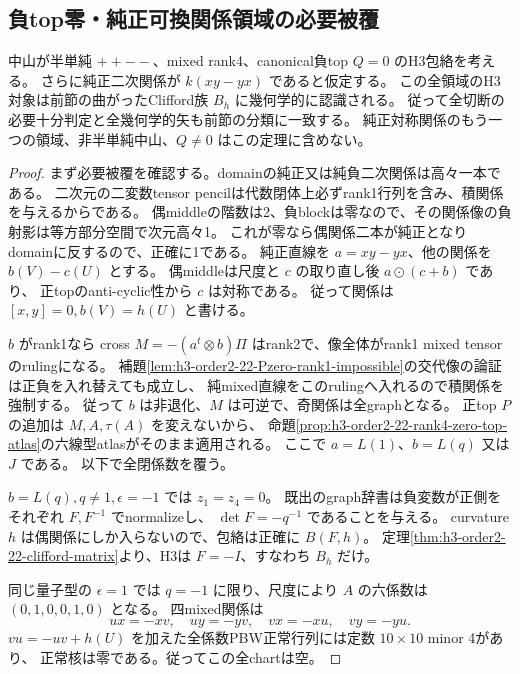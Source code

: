 \subsection{負top零・純正可換関係領域の必要被覆}
\label{subsec:h3-order2-22-Qzero-commutative}
\begin{theorem}\label{thm:h3-order2-22-Qzero-commutative}
中山が半単純 $++--$、mixed rank4、canonical負top $Q=0$ のH3包絡を考える。
さらに純正二次関係が $k(xy-yx)$ であると仮定する。
この全領域のH3対象は前節の曲がったClifford族 $B_h$ に幾何学的に認識される。
従って全切断の必要十分判定と全幾何学的矢も前節の分類に一致する。
純正対称関係のもう一つの領域、非半単純中山、$Q\ne0$ はこの定理に含めない。
\end{theorem}
\begin{proof}
まず必要被覆を確認する。domainの純正又は純負二次関係は高々一本である。
二次元の二変数tensor pencilは代数閉体上必ずrank1行列を含み、積関係を与えるからである。
偶middleの階数は2、負blockは零なので、その関係像の負射影は等方部分空間で次元高々1。
これが零なら偶関係二本が純正となりdomainに反するので、正確に1である。
純正直線を $a=xy-yx$、他の関係を $b(V)-c(U)$ とする。
偶middleは尺度と $c$ の取り直し後 $a\odot(c+b)$ であり、
正topのanti-cyclic性から $c$ は対称である。
従って関係は $[x,y]=0,b(V)=h(U)$ と書ける。

$b$ がrank1なら cross $M=-(a^t\otimes b)\Pi$ はrank2で、像全体がrank1 mixed tensorのrulingになる。
補題\ref{lem:h3-order2-22-Pzero-rank1-impossible}の交代像の論証は正負を入れ替えても成立し、
純mixed直線をこのrulingへ入れるので積関係を強制する。
従って $b$ は非退化、$M$ は可逆で、奇関係は全graphとなる。
正top $P$ の追加は $M,A,\tau(A)$ を変えないから、
命題\ref{prop:h3-order2-22-rank4-zero-top-atlas}の六線型atlasがそのまま適用される。
ここで $a=L(1)$、$b=L(q)$ 又は $J$ である。
以下で全閉係数を覆う。

$b=L(q),q\ne1,\epsilon=-1$ では $z_1=z_4=0$。
既出のgraph辞書は負変数が正側をそれぞれ $F,F^{-1}$ でnormalizeし、
$\det F=-q^{-1}$ であることを与える。
curvature $h$ は偶関係にしか入らないので、包絡は正確に $B(F,h)$。
定理\ref{thm:h3-order2-22-clifford-matrix}より、H3は $F=-I$、すなわち $B_h$ だけ。

同じ量子型の $\epsilon=1$ では $q=-1$ に限り、尺度により
$A$ の六係数は $(0,1,0,0,1,0)$ となる。
四mixed関係は
\[
 ux=-xv,\quad uy=-yv,\quad vx=-xu,\quad vy=-yu.
\]
$vu=-uv+h(U)$ を加えた全係数PBW正常行列には定数 $10\times10$ minor 4があり、
正常核は零である。従ってこの全chartは空。


\end{proof}
